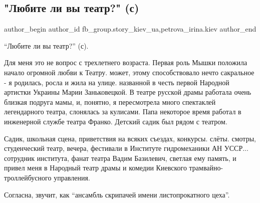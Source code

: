  
 
 
 
 
 
\subsection{"Любите ли вы театр?" (с)}
\label{sec:16_01_2022.fb.fb_group.story_kiev_ua.1.ljubite_li_vy_teatr}
 
\ifcmt
 author_begin
   author_id fb_group.story_kiev_ua,petrova_irina.kiev
 author_end
\fi

\enquote{Любите ли вы театр?} (с). 

Для меня это не вопрос с трехлетнего возраста. Первая роль Мышки положила
начало огромной любви к Театру. может, этому способствовало нечто сакральное -
я родилась, росла и жила на улице. названной в честь первой Народной артистки
Украины Марии Заньковецкой. В театре русской драмы работала очень близкая
подруга мамы, и, понятно, я пересмотрела много спектаклей легендарного театра,
слонялась за кулисами. Папа некоторое время работал в инженерной службе театра
Франко. Детский садик был рядом с театром.

\raggedcolumns
\begin{multicols}{3} %
\setlength{\parindent}{0pt}


\end{multicols} %

Садик, школьная сцена, приветствия на всяких съездах, конкурсы. слёты. смотры,
студенческий театр, вечера, фестивали в Институте гидромеханики АН
УССР... сотрудник института, фанат театра Вадим Базилевич, светлая ему память,
и привел меня в Народный театр драмы и комедии Киевского
трамвайно-троллейбусного управления. 

Согласна, звучит, как  \enquote{ансамбль скрипачей  имени листопрокатного цеха}.

